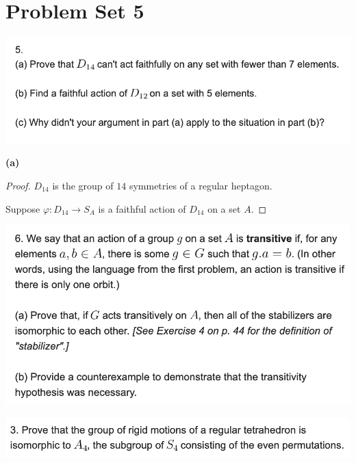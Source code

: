 \section*{Problem  Set 5}

\begin{mdframed}
\includegraphics[width=400pt]{img/abstract-algebra--nf--4-1b73.png}
\end{mdframed}
{\bf (a)}
\begin{proof}
  $D_{14}$ is the group of $14$ symmetries of a regular heptagon.

  Suppose $\varphi: D_{14} \to S_A$ is a faithful action of $D_{14}$ on a set $A$.

\end{proof}



\begin{mdframed}
\includegraphics[width=400pt]{img/abstract-algebra--nf--4-50ae.png}
\end{mdframed}


\begin{mdframed}
\includegraphics[width=400pt]{img/abstract-algebra--nf--5-7356.png}
\end{mdframed}



